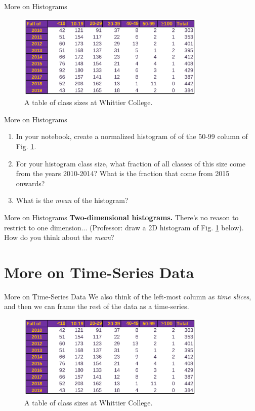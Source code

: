 \documentclass{beamer}
\begin{document}
\begin{frame}{More on Histograms}
\begin{figure}
\centering
\includegraphics[width=0.8\textwidth]{figures/class_size.png}
\caption{\label{fig:class_size} A table of class sizes at Whittier College.}
\end{figure}
\end{frame}

\begin{frame}{More on Histograms}
\begin{enumerate}
\item In your notebook, create a normalized histogram of of the 50-99 column of Fig. \ref{fig:class_size}.
\item For your histogram class size, what fraction of all classes of this size come from the years 2010-2014?  What is the fraction that come from 2015 onwards?
\item What is the \textit{mean} of the histogram?
\end{enumerate}
\end{frame}

\begin{frame}{More on Histograms}
\textbf{Two-dimensional histograms.}  There's no reason to restrict to one dimension... (Professor: draw a 2D histogram of Fig. \ref{fig:class_size} below). \\ \vspace{6cm}
How do you think about the \textit{mean}?
\end{frame}

\section{More on Time-Series Data}

\begin{frame}{More on Time-Series Data}
We also think of the left-most column as \textit{time slices}, and then we can frame the rest of the data as a time-series.
\begin{figure}
\centering
\includegraphics[width=0.8\textwidth]{figures/class_size.png}
\caption{\label{fig:class_size2} A table of class sizes at Whittier College.}
\end{figure}
\end{frame}
\end{document}
